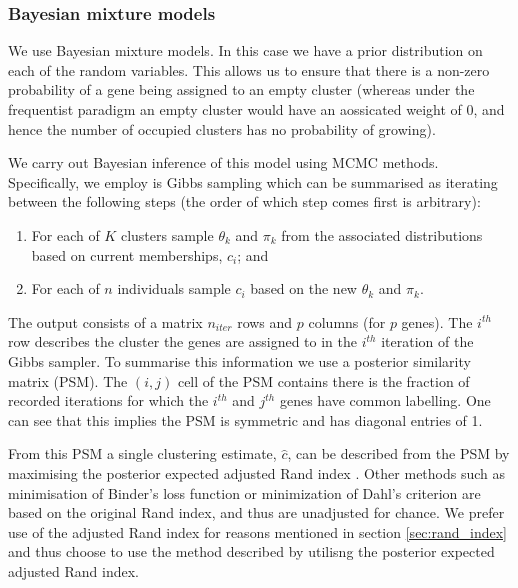 \documentclass[12pt]{article} %
\begin{document}
	\subsubsection{Bayesian mixture models}
	We use Bayesian mixture models. In this case we have a prior distribution on each of the random variables. This allows us to ensure that there is a non-zero probability of a gene being assigned to an empty cluster (whereas under the frequentist paradigm an empty cluster would have an aossicated weight of 0, and hence the number of occupied clusters has no probability of growing). 
	
	We carry out Bayesian inference of this model using MCMC methods. Specifically, we employ is Gibbs sampling which can be summarised as iterating between the following steps (the order of which step comes first is arbitrary):
	\begin{enumerate}
		\item For each of $K$ clusters sample $\theta_k$ and $\pi_k$ from the associated distributions based on current memberships, $c_i$; and
		\item For each of $n$ individuals sample $c_i$ based on the new $\theta_k$ and $\pi_k$.
	\end{enumerate}
	The output consists of a matrix $n_{iter}$ rows and $p$ columns (for $p$ genes). The $i^{th}$ row describes the cluster the genes are assigned to in the $i^{th}$ iteration of the Gibbs sampler. To summarise this information we use a posterior similarity matrix (PSM). The $(i,j)$ cell of the PSM contains there is the fraction of recorded iterations for which the $i^{th}$ and $j^{th}$ genes have common labelling. One can see that this implies the PSM is symmetric and has diagonal entries of 1.
	
	From this PSM a single clustering estimate, $\hat{c}$, can be described from the PSM by maximising the posterior expected adjusted Rand index \cite{FritschImprovedcriteriaclustering2009}. Other methods such as minimisation of Binder's loss function or  minimization of Dahl’s criterion are based on the original Rand index, and thus are unadjusted for chance. We prefer use of the adjusted Rand index for reasons mentioned in section \ref{sec:rand_index} and thus choose to use the method described by \citet{FritschImprovedcriteriaclustering2009} utilisng the  posterior expected adjusted Rand index.
	
\end{document}
